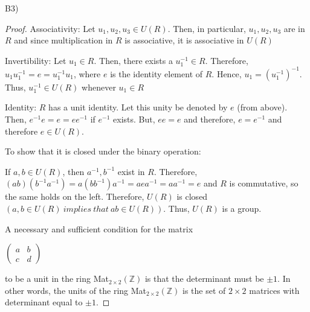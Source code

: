 \documentclass[executivepaper]{article}
\begin{document}
\begin{flushleft}

B3)

\begin{proof}

Associativity: Let $u_{1}, u_{2}, u_{3} \in U(R)$. Then, in particular, $u_{1}, u_{2}, u_{3}$ are in $R$ and since multiplication in $R$ is associative, it is associative in $U(R)$

\vspace{2mm}

Invertibility: Let $u_{1} \in R$. Then, there exists a $u_{1}^{-1} \in R$. Therefore, $u_{1}u_{1}^{-1}=e=u_{1}^{-1}u_{1}$, where $e$ is the identity element of $R$. Hence, $u_{1}=\left(u_{1}^{-1}\right)^{-1}$. Thus, $u_{1}^{-1} \in U(R)$ whenever $u_{1} \in R$

\vspace{2mm}

Identity: $R$ has a unit identity. Let this unity be denoted by $e$ (from above). Then, $e^{-1}e=e=ee^{-1}$ if $e^{-1}$ exists. But, $ee=e$ and therefore, $e=e^{-1}$ and therefore $e \in U(R)$.

\vspace{2mm}

To show that it is closed under the binary operation:

\begin{center}

If $a,b \in U(R)$, then $a^{-1}, b^{-1}$ exist in $R$. Therefore, $(ab)\left(b^{-1}a^{-1}\right)=a\left(bb^{-1}\right)a^{-1}=aea^{-1}=aa^{-1}=e$ and $R$ is commutative, so the same holds on the left. Therefore, $U(R)$ is closed $\left(a, b \in U(R) ~ implies ~ that ~ ab \in U(R)\right)$. Thus, $U(R)$ is a group. 

\end{center}

\vspace{3mm}

A necessary and sufficient condition for the matrix

\begin{center}

$\begin{pmatrix}

a & b\\

c & d

\end{pmatrix}$ 

\end{center}

to be a unit in the ring Mat$_{2 \times 2}\left(\mathbb{Z}\right)$ is that the determinant must be $\pm 1$. In other words, the units of the ring Mat$_{2 \times 2}\left(\mathbb{Z}\right)$ is the set of $2 \times 2$ matrices with determinant equal to $\pm 1$.

\end{proof}

\end{flushleft}
\end{document}
